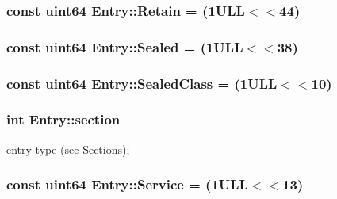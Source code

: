 \subsubsection[{Retain}]{\setlength{\rightskip}{0pt plus 5cm}const {\bf uint64} Entry\+::\+Retain = (1\+U\+L\+L$<$$<$44)\hspace{0.3cm}{\ttfamily [static]}}\label{class_entry_a4e58873aeb4db094eca72da7444161e9}
\hypertarget{class_entry_a39e7b20eb9fc71542b0d22beea8c3dc3}{}
\subsubsection[{Sealed}]{\setlength{\rightskip}{0pt plus 5cm}const {\bf uint64} Entry\+::\+Sealed = (1\+U\+L\+L$<$$<$38)\hspace{0.3cm}{\ttfamily [static]}}\label{class_entry_a39e7b20eb9fc71542b0d22beea8c3dc3}
\hypertarget{class_entry_a52ebcc0cc1ada1d65110f17c5a53bae8}{}
\subsubsection[{Sealed\+Class}]{\setlength{\rightskip}{0pt plus 5cm}const {\bf uint64} Entry\+::\+Sealed\+Class = (1\+U\+L\+L$<$$<$10)\hspace{0.3cm}{\ttfamily [static]}}\label{class_entry_a52ebcc0cc1ada1d65110f17c5a53bae8}
\hypertarget{class_entry_a9197cdd8acd8fc0670e2911a407f3d04}{}
\subsubsection[{section}]{\setlength{\rightskip}{0pt plus 5cm}int Entry\+::section}\label{class_entry_a9197cdd8acd8fc0670e2911a407f3d04}


entry type (see Sections); 

\hypertarget{class_entry_a9547b8789d4e3947195c1d61f5e1a96a}{}
\subsubsection[{Service}]{\setlength{\rightskip}{0pt plus 5cm}const {\bf uint64} Entry\+::\+Service = (1\+U\+L\+L$<$$<$13)\hspace{0.3cm}{\ttfamily [static]}}\label{class_entry_a9547b8789d4e3947195c1d61f5e1a96a}
\hypertarget{class_entry_afce6228666d983de4eb2c817ab80c035}{}
